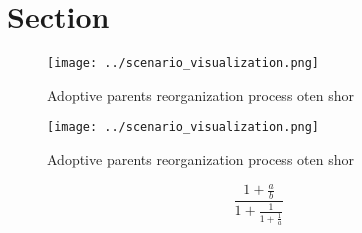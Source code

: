 \documentclass[a4paper]{article}
\begin{document}
\section{Section}

\begin{figure}
\centering
\texttt{[image: ../scenario\_visualization.png]}
\caption{Adoptive parents reorganization process oten shor
}
\end{figure}
 
\begin{figure}
\centering
\texttt{[image: ../scenario\_visualization.png]}
\caption{Adoptive parents reorganization process oten shor
}
\end{figure}
 
\[ \frac{1+\frac{a}{b}}{1+\frac{1}{1+\frac{1}{a}}} \]
\end{document}
